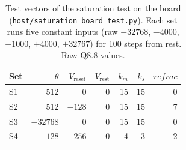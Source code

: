\documentclass[11pt]{article}
\begin{document}
\begin{table}[t]
\centering
\caption{Runs that reached a saturation limit, and their comparison with the model. Limits: $I$ and $V$ are the current and potential updates, with upper or lower limit. In the S3 and S4 row, the one run that reached no limit is S4 with input $+4000$ (raw); it still matched the model.}
\label{tab:sat}
{\small{}}
\end{table}


\begin{table}[t]
\centering
\caption{Test vectors of the saturation test on the board (\texttt{host/saturation\_board\_test.py}). Each set runs five constant inputs (raw $-32768$, $-4000$, $-1000$, $+4000$, $+32767$) for 100 steps from rest. Raw Q8.8 values.}
\label{tab:svec}
\begin{tabular}{lrrrrrr}
\toprule
Set & $\theta$ & $V_{\mathrm{reset}}$ & $V_{\mathrm{rest}}$ & $k_m$ & $k_s$ & $\mathit{refrac}$ \\
\midrule
S1 & 512 & 0 & 0 & 15 & 15 & 0 \\
S2 & 512 & $-128$ & 0 & 15 & 15 & 7 \\
S3 & $-32768$ & 0 & 0 & 15 & 15 & 0 \\
S4 & $-128$ & $-256$ & 0 & 4 & 3 & 2 \\
\bottomrule
\end{tabular}
\end{table}
\end{document}
